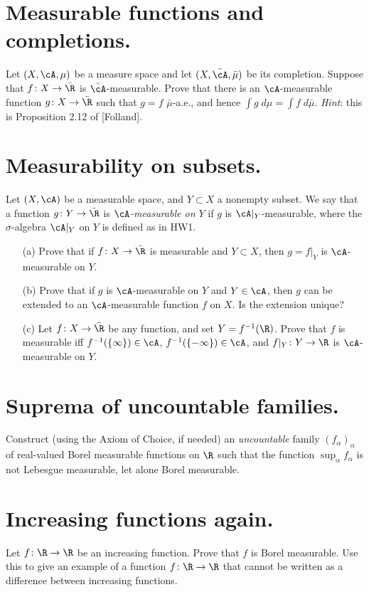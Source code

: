\documentclass[lang=cn,11pt]{elegantbook}
\begin{document}
\section{Measurable functions and completions.}
  Let $(X,\cA,\mu)$ be a measure space and let $(X, \bar{\cA}, \bar{\mu})$ be its completion. 
Suppose that $f\colon X\to\bar\R$ is $\bar{\cA}$-measurable. Prove that there is an $\cA$-measurable function $g\colon X\to\bar\R$ such that $g=f$ $\bar{\mu}$-a.e.,  and hence $\int g  \;d\mu=\int f \;d\bar{\mu}$. 
\textit{Hint}: this is Proposition 2.12 of [Folland].

\section{Measurability on subsets.}
  Let $(X,\cA)$ be a measurable space, and $Y\subset X$ a nonempty subset.
  We say that a function $g\colon Y\to\bar\R$ is \emph{$\cA$-measurable on $Y$} if $g$ is $\cA|_Y$-measurable, where the $\sigma$-algebra $\cA|_Y$ on $Y$ is defined as in HW1.
  \begin{itemize}
  \item[(a)]
    Prove that if $f\colon X\to\bar\R$ is measurable and $Y\subset X$, then $g=f|_Y$ is $\cA$-measurable on $Y$. 
  \item[(b)]
    Prove that if $g$ is $\cA$-measurable on $Y$ and $Y\in \cA$, then $g$ can be extended to an $\cA$-measurable function $f$ on $X$. Is the extension unique?
  \item[(c)]
    Let $f\colon X\to\bar\R$ be any function, and set $Y=f^{-1}(\R)$. Prove that $f$ is measurable iff $f^{-1}(\{\infty\})\in \cA$, $f^{-1}(\{-\infty\})\in \cA$, and 
    $f|_Y\colon Y\to\R$ is $\cA$-measurable on $Y$.
  \end{itemize}

\section{Suprema of uncountable families.}
  Construct (using the Axiom of Choice, if needed) an \emph{uncountable} family $(f_\alpha)_\alpha$ of real-valued Borel measurable functions on $\R$ such that the function $\sup_\alpha f_\alpha$ is not Lebesgue measurable, let alone Borel measurable.

\section{Increasing functions again.}
  Let $f\colon\R\to\R$ be an increasing function. Prove that $f$ is Borel measurable. Use this to give an example of a function $f\colon\R\to\R$ that cannot be written as a difference between increasing functions.
\end{document}
